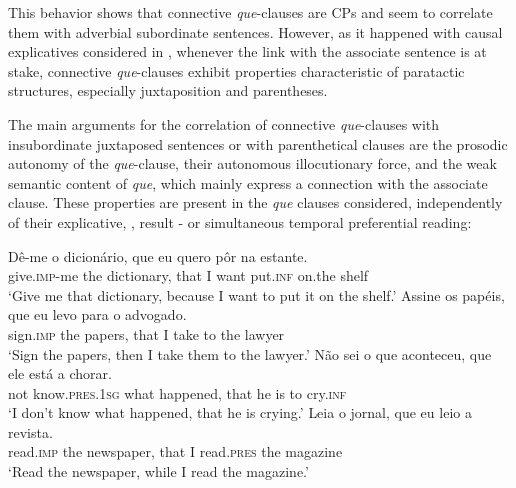 \documentclass[output=paper,colorlinks,citecolor=brown,
]{langscibook}
\begin{document}
 \label{ex:matos:compre-elipse}
\z 

 \label{ex:matos:gelado-elipse}
\z 

This behavior shows that connective \textit{que}-clauses are CPs and seem to correlate them with adverbial subordinate sentences. However, as it happened with causal explicatives considered in , whenever the link with the associate sentence is at stake, connective \textit{que}-clauses exhibit properties characteristic of paratactic structures, especially juxtaposition and parentheses.

The main arguments for the correlation of connective \textit{que}-clauses with insubordinate juxtaposed sentences or with parenthetical clauses are the prosodic autonomy of the \textit{que}-clause, their autonomous illocutionary force, and the weak semantic content of \textit{que}, which mainly express a connection with the associate clause. These properties are present in the \textit{que} clauses considered, independently of their explicative, , result - or simultaneous temporal  preferential reading: 

\ea \label{ex:matos:deme-dicionario}
 \ea \label{ex:matos:deme-dicionario-a}
 \gll Dê-me o dicionário, que eu quero pôr na estante.\\
	  give.\textsc{imp}-me the dictionary, that I want put.\textsc{inf} on.the shelf\\
 \glt ‘Give me that dictionary, because I want to put it on the shelf.’
 \ex \label{ex:matos:assine-papeis}
 \gll Assine os papéis, que eu levo para o advogado.\\
	  sign.\textsc{imp} the papers, that I take to the lawyer\\
 \glt ‘Sign the papers, then I take them to the lawyer.’
 \ex \label{ex:matos:nao-sei-chorar}
 \gll Não sei {o que} aconteceu, que ele está a chorar.\\
	  not know.\textsc{pres}.\textsc{1sg} what happened, that he is to cry.\textsc{inf}\\
 \glt ‘I don’t know what happened, that he is crying.’
 \ex \label{ex:matos:jornal-revista}
 \gll Leia o jornal, que eu leio a revista.\\
	read.\textsc{imp} the newspaper, that I read.\textsc{pres} the magazine\\
 \glt ‘Read the newspaper, while I read the magazine.’
 \z
\z 
 
\end{document}

